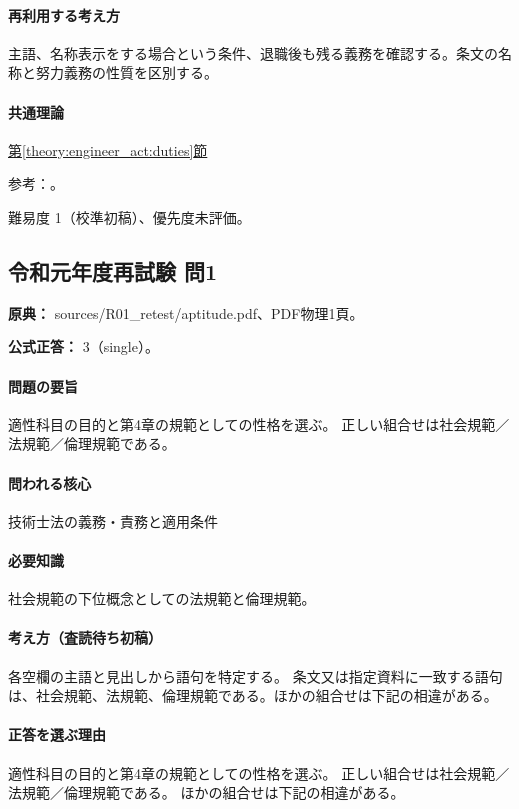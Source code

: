 \paragraph{再利用する考え方} 主語、名称表示をする場合という条件、退職後も残る義務を確認する。条文の名称と努力義務の性質を区別する。

\paragraph{共通理論} \hyperref[theory:engineer_act:duties]{第\ref*{theory:engineer_act:duties}節}

\par 参考：\cite{engineer_act_current}。

\par 難易度 1（校準初稿）、優先度未評価。

\subsection{令和元年度再試験 問1}
\label{q:r01-ret-apt-01}

\noindent\textbf{原典：} sources/R01\_retest/aptitude.pdf、PDF物理1頁。

\textbf{公式正答：} 3（single）。

\paragraph{問題の要旨} 適性科目の目的と第4章の規範としての性格を選ぶ。 正しい組合せは社会規範／法規範／倫理規範である。

\paragraph{問われる核心} 技術士法の義務・責務と適用条件

\paragraph{必要知識} 社会規範の下位概念としての法規範と倫理規範。

\paragraph{考え方（査読待ち初稿）} 各空欄の主語と見出しから語句を特定する。 条文又は指定資料に一致する語句は、社会規範、法規範、倫理規範である。ほかの組合せは下記の相違がある。

\paragraph{正答を選ぶ理由} 適性科目の目的と第4章の規範としての性格を選ぶ。 正しい組合せは社会規範／法規範／倫理規範である。 ほかの組合せは下記の相違がある。

